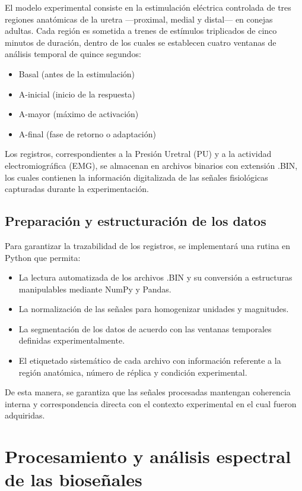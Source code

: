 El modelo experimental consiste en la estimulación eléctrica controlada de tres regiones anatómicas de la uretra —proximal, medial y distal— en conejas adultas. Cada región es sometida a trenes de estímulos triplicados de cinco minutos de duración, dentro de los cuales se establecen cuatro ventanas de análisis temporal de quince segundos:

\begin{itemize}
	\item Basal (antes de la estimulación)
	\item A-inicial (inicio de la respuesta)
	\item A-mayor (máximo de activación)
	\item A-final (fase de retorno o adaptación)
\end{itemize}

Los registros, correspondientes a la Presión Uretral (PU) y a la actividad electromiográfica (EMG), se almacenan en archivos binarios con extensión .BIN, los cuales contienen la información digitalizada de las señales fisiológicas capturadas durante la experimentación.

\subsection{Preparación y estructuración de los datos}
Para garantizar la trazabilidad de los registros, se implementará una rutina en Python que permita:

\begin{itemize}
	\item La lectura automatizada de los archivos .BIN y su conversión a estructuras manipulables mediante NumPy y Pandas.
	\item La normalización de las señales para homogenizar unidades y magnitudes.
	\item La segmentación de los datos de acuerdo con las ventanas temporales definidas experimentalmente.
	\item El etiquetado sistemático de cada archivo con información referente a la región anatómica, número de réplica y condición experimental.
\end{itemize}

De esta manera, se garantiza que las señales procesadas mantengan coherencia interna y correspondencia directa con el contexto experimental en el cual fueron adquiridas.

\section{Procesamiento y análisis espectral de las bioseñales}

